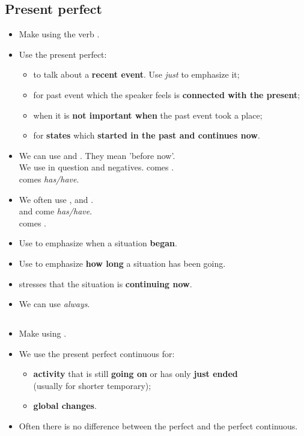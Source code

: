 \subsection{Present perfect}
\begin{itemize}
    \item Make using the verb .
    \item Use the present perfect:
    \begin{itemize}
        \item to talk about a \textbf{recent event}. Use \textit{just} to emphasize it;
        \item for past event which the speaker feels is \textbf{connected with the present};
        \item when it is \textbf{not important when} the past event took a place;
        \item for \textbf{states} which \textbf{started in the past and continues now}.
    \end{itemize}
    \item We can use  and . They mean 'before now'.\\
    We use  in question and negatives.  comes .\\
     comes  \textit{has/have}.
    \item We often use ,  and .\\
     and  come  \textit{has/have}.\\
     comes .
    \item Use  to emphasize when a situation \textbf{began}.
    \item Use  to emphasize \textbf{how long} a situation has been going.
    \item {} stresses that the situation is \textbf{continuing now}.
    \item[\ast] We can use \textit{always}.
\end{itemize}

\subsection{}
\begin{itemize}
    \item[\doot] Make using .
    \item[\doot] We use the present perfect continuous for:
    \begin{itemize}
        \item[\daash] \textbf{activity} that is still \textbf{going on} or has only \textbf{just ended}\\
        (usually for shorter temporary);
        \item[\daash] \textbf{global changes}.
    \end{itemize}
    \item[\aast] Often there is no difference between the perfect and the perfect continuous.
\end{itemize}